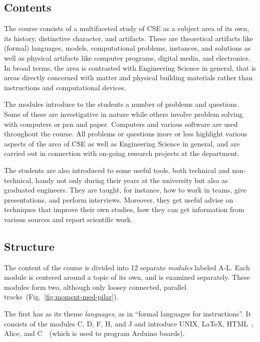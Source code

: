 \documentclass[conference]{IEEEtran}
\begin{document}
\subsection{Contents}

The course consists of a multifaceted study of CSE as a subject area of its own, its history, distinctive character, and artifacts. These are theoretical artifacts like (formal) languages, models, computational problems, instances, and solutions as well as physical artifacts like computer programs, digital media, and electronics. In broad terms, the area is contrasted with Engineering Science in general, that is areas directly concerned with matter and physical building materials rather than instructions and computational devices. 

The modules introduce to the students a number of problems and questions. Some of these are investigative in nature while others involve problem solving with computers or pen and paper. Computers and various software are used throughout the course. All problems or questions more or less highlight various aspects of the area of CSE as well as Engineering Science in general, and are carried out in connection with on-going research projects at the department. 

The students are also introduced to some useful tools, both technical and non-technical, handy not only during their years at the university but also as graduated engineers. They are taught, for instance, how to work in teams, give presentations, and perform interviews. Moreover, they get useful advise on techniques that improve their own studies, how they can get  information from various sources and report scientific work.

\subsection{Structure} \label{sec:modules}

The content of the course is divided into 12 separate \emph{modules} labeled A-L. Each module is centered around a topic of its own, and is examined separately. These modules form two, although only loosey connected, parallel tracks~(Fig.~\ref{fig:moment-med-pilar}). 

The first has as its theme \emph{languages}, as in ``formal languages for instructions''. It consists of the modules C, D, F, H, and J and introduce UNIX, \LaTeX, HTML~\cite{html}, Alice, and C~\cite{Kernighan:1978:CPL:7519}~(which is used to program Arduino boards).
\end{document}
